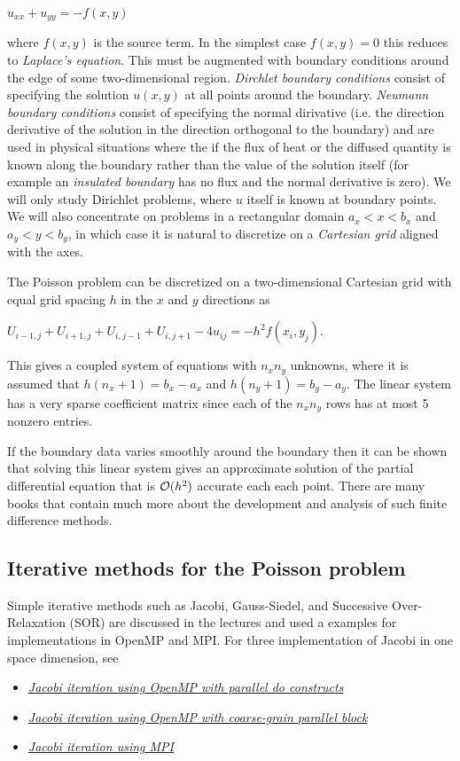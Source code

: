 \documentclass[letterpaper,10pt,english]{sphinxmanual}
\begin{document}
$u_{xx} + u_{yy} = -f(x,y)$

where $f(x,y)$ is the source term.  In the simplest case
$f(x,y) = 0$ this reduces to \emph{Laplace's equation}.
This must be augmented with boundary conditions around the edge of some
two-dimensional region.  \emph{Dirchlet boundary conditions} consist of
specifying the solution $u(x,y)$ at all points around the boundary.
\emph{Neumann boundary conditions} consist of specifying the normal dirivative
(i.e. the direction derivative of the solution in the direction orthogonal
to the boundary) and are used in physical situations where the if the flux of
heat or the diffused quantity is known along the boundary rather than the
value of the solution itself (for example an \emph{insulated boundary} has no
flux and the normal derivative is zero).  We will only study Dirichlet
problems, where $u$ itself is known at boundary points.  We will also
concentrate on problems in a rectangular domain $a_x < x < b_x$ and
$a_y < y < b_y$, in which case it is natural to discretize
on a \emph{Cartesian grid} aligned with the axes.

The Poisson problem can be discretized on a two-dimensional Cartesian grid
with equal grid
spacing $h$ in the $x$ and $y$ directions as

$U_{i-1,j} + U_{i+1,j} + U_{i,j-1} + U_{i,j+1} - 4u_{ij} = -h^2
f(x_i,y_j)$.

This gives a coupled system of equations with $n_x n_y$ unknowns,
where it is assumed that $h(n_x+1) = b_x - a_x$ and
$h(n_y+1) = b_y - a_y$.  The linear system has a very sparse
coefficient matrix since each of the $n_x n_y$ rows has at most 5
nonzero entries.

If the boundary data varies smoothly around the boundary then it can be
shown that solving this linear system gives an approximate solution
of the partial differential equation that is ${\cal O}(h^2)$ accurate
each each point.  There are many books that contain much
more about the development and analysis of such finite difference methods.


\subsection{Iterative methods for the Poisson problem}
\label{poisson:poisson-iter}\label{poisson:iterative-methods-for-the-poisson-problem}
Simple iterative methods such as Jacobi, Gauss-Siedel, and Successive
Over-Relaxation (SOR) are discussed in the lectures and used a examples for
implementations in OpenMP and MPI.  For three implementation of Jacobi in
one space dimension, see
\begin{itemize}
\item {} 
{\hyperref[jacobi1d_omp1:jacobi1d-omp1]{\emph{Jacobi iteration using OpenMP with parallel do constructs}}}

\item {} 
{\hyperref[jacobi1d_omp2:jacobi1d-omp2]{\emph{Jacobi iteration using OpenMP with coarse-grain parallel block}}}

\item {} 
{\hyperref[jacobi1d_mpi:jacobi1d-mpi]{\emph{Jacobi iteration using MPI}}}

\end{itemize}
\end{document}
